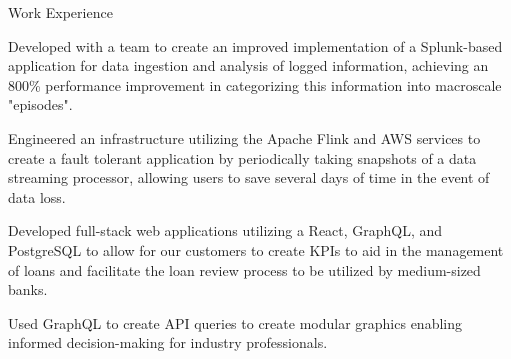 \documentclass{resume} %
\begin{document}
\begin{workSection}{Work Experience}
    \experienceItem[
        company=Georgia Tech Research Institute- Advanced Concepts Laboratory,
        location=Atlanta{,} GA,
        position=Graduate Research Assistant,
        duration=May 2024 - Present
    ]
    \begin{bullets}
        \item 
    \end{bullets}
    \experienceItem[
        company=Splunk,
        location=San Jose{,} CA,
        position=Backend Software Engineer Intern,
        duration=May 2023 - July 2023
    ]
     \begin{bullets}
        \item Developed with a team to create an improved implementation of a Splunk-based application for data ingestion and analysis of logged information, achieving an 800\% performance improvement in categorizing this information into macroscale "episodes".
        \item Engineered an infrastructure utilizing the Apache Flink and AWS services to create a fault tolerant application by periodically taking snapshots of a data streaming processor, allowing users to save several days of time in the event of data loss.
     \end{bullets}
     
    \experienceItem[
        company=QwickRate,
        location=Marietta{,} GA (Remote),
        position=Software Engineer Intern,
        duration=August 2022 - April 2023
    ]
    \begin{bullets}
        \item Developed full-stack web applications utilizing a React, GraphQL, and PostgreSQL to allow for our customers to create KPIs to aid in the management of loans and facilitate the loan review process to be utilized by medium-sized banks.
        \item Used GraphQL to create API queries to create modular graphics enabling informed decision-making for industry professionals.
     \end{bullets}


\end{workSection}
\end{document}
